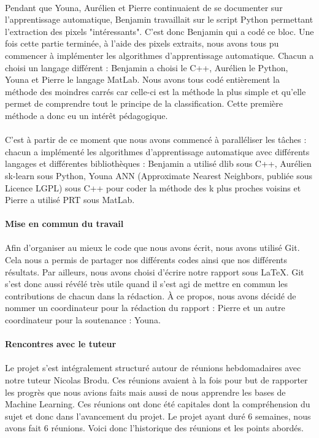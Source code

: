 \documentclass[a4paper,10pt]{article}
\begin{document}
\paragraph{}
Pendant que Youna, Aurélien et Pierre continuaient de se documenter sur l'apprentissage automatique, Benjamin travaillait sur le script Python permettant l'extraction des pixels "intéressants". C'est donc Benjamin qui a codé ce bloc. Une fois cette partie terminée, à l'aide des pixels extraits, nous avons tous pu commencer à implémenter les algorithmes d'apprentissage automatique. Chacun a choisi un langage différent : Benjamin a choisi le C++, Aurélien le Python, Youna et Pierre le langage MatLab. Nous avons tous codé entièrement la méthode des moindres carrés car celle-ci est la méthode la plus simple et qu'elle permet de comprendre tout le principe de la classification. Cette première méthode a donc eu un intérêt pédagogique.
\paragraph{}
C'est à partir de ce moment que nous avons commencé à paralléliser les tâches : chacun a implémenté les algorithmes d'apprentissage automatique avec différents langages et différentes bibliothèques : Benjamin a utilisé dlib sous C++, Aurélien sk-learn sous Python, Youna ANN (Approximate Nearest Neighbors, publiée sous Licence LGPL) sous C++ pour coder la méthode des k plus proches voisins et Pierre a utilisé PRT sous MatLab.
\paragraph{Mise en commun du travail}
\paragraph{}
Afin d'organiser au mieux le code que nous avons écrit, nous avons utilisé Git. Cela nous a permis de partager nos différents codes ainsi que nos différents résultats. Par ailleurs, nous avons choisi d'écrire notre rapport sous LaTeX. Git s'est donc aussi révélé très utile quand il s'est agi de mettre en commun les contributions de chacun dans la rédaction. À ce propos, nous avons décidé de nommer un coordinateur pour la rédaction du rapport : Pierre et un autre coordinateur pour la soutenance : Youna.
\paragraph{Rencontres avec le tuteur}
\paragraph{}
Le projet s'est intégralement structuré autour de réunions hebdomadaires avec notre tuteur Nicolas Brodu. Ces réunions avaient à la fois pour but de rapporter les progrès que nous avions faits mais aussi de nous apprendre les bases de Machine Learning. Ces réunions ont donc été capitales dont la compréhension du sujet et donc dans l'avancement du projet. Le projet ayant duré 6 semaines, nous avons fait 6 réunions. Voici donc l'historique des réunions et les points abordés.
\end{document}
